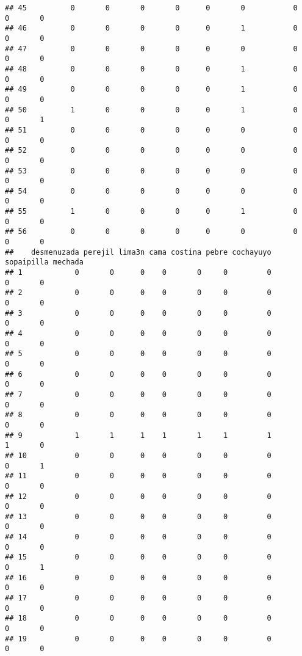 \documentclass[
]{article}
\begin{document}
\begin{verbatim}
## 45          0       0       0       0      0       0           0      0       0
## 46          0       0       0       0      0       1           0      0       0
## 47          0       0       0       0      0       0           0      0       0
## 48          0       0       0       0      0       1           0      0       0
## 49          0       0       0       0      0       1           0      0       0
## 50          1       0       0       0      0       1           0      0       1
## 51          0       0       0       0      0       0           0      0       0
## 52          0       0       0       0      0       0           0      0       0
## 53          0       0       0       0      0       0           0      0       0
## 54          0       0       0       0      0       0           0      0       0
## 55          1       0       0       0      0       1           0      0       0
## 56          0       0       0       0      0       0           0      0       0
##    desmenuzada perejil lima3n cama costina pebre cochayuyo sopaipilla mechada
## 1            0       0      0    0       0     0         0          0       0
## 2            0       0      0    0       0     0         0          0       0
## 3            0       0      0    0       0     0         0          0       0
## 4            0       0      0    0       0     0         0          0       0
## 5            0       0      0    0       0     0         0          0       0
## 6            0       0      0    0       0     0         0          0       0
## 7            0       0      0    0       0     0         0          0       0
## 8            0       0      0    0       0     0         0          0       0
## 9            1       1      1    1       1     1         1          1       0
## 10           0       0      0    0       0     0         0          0       1
## 11           0       0      0    0       0     0         0          0       0
## 12           0       0      0    0       0     0         0          0       0
## 13           0       0      0    0       0     0         0          0       0
## 14           0       0      0    0       0     0         0          0       0
## 15           0       0      0    0       0     0         0          0       1
## 16           0       0      0    0       0     0         0          0       0
## 17           0       0      0    0       0     0         0          0       0
## 18           0       0      0    0       0     0         0          0       0
## 19           0       0      0    0       0     0         0          0       0

\end{verbatim}
\end{document}
